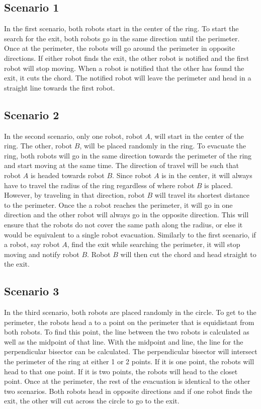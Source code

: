 \documentclass[12pt,letterpaper]{article}
\begin{document}
    \subsection{Scenario 1}
        In the first scenario, both robots start in the center of the ring. To start the search for the exit, both robots go in the same direction until the perimeter. Once at the perimeter, the robots will go around the perimeter in opposite directions. If either robot finds the exit, the other robot is notified and the first robot will stop moving. When a robot is notified that the other has found the exit, it cuts the chord. The notified robot will leave the perimeter and head in a straight line towards the first robot.
        
    \subsection{Scenario 2}
        In the second scenario, only one robot, robot $A$, will start in the center of the ring. The other, robot $B$, will be placed randomly in the ring. To evacuate the ring, both robots will go in the same direction towards the perimeter of the ring and start moving at the same time. The direction of travel will be such that robot $A$ is headed towards robot $B$. Since robot $A$ is in the center, it will always have to travel the radius of the ring regardless of where robot $B$ is placed. However, by traveling in that direction, robot $B$ will travel its shortest distance to the perimeter. Once the a robot reaches the perimeter, it will go in one direction and the other robot will always go in the opposite direction. This will ensure that the robots do not cover the same path along the radius, or else it would be equivalent to a single robot evacuation. Similarly to the first scenario, if a robot, say robot $A$, find the exit while searching the perimeter, it will stop moving and notify robot $B$. Robot $B$ will then cut the chord and head straight to the exit.
    
    \subsection{Scenario 3}
        In the third scenario, both robots are placed randomly in the circle. To get to the perimeter, the robots head a to a point on the perimeter that is equidistant from both robots. To find this point, the line between the two robots is calculated as well as the midpoint of that line. With the midpoint and line, the line for the perpendicular bisector can be calculated. The perpendicular bisector will intersect the perimeter of the ring at either 1 or 2 points. If it is one point, the robots will head to that one point. If it is two points, the robots will head to the closet point. Once at the perimeter, the rest of the evacuation is identical to the other two scenarios. Both robots head in opposite directions and if one robot finds the exit, the other will cut across the circle to go to the exit.
\end{document}
